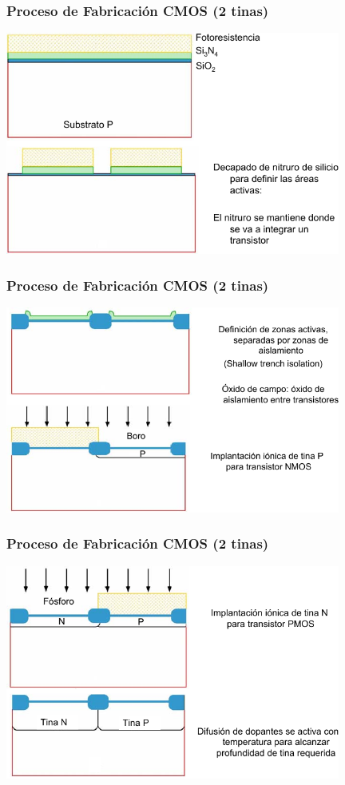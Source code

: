 \documentclass[aspectratio=169,10pt]{beamer}
\begin{document}
\begin{frame}
\frametitle{Proceso de Fabricación CMOS (2 tinas)}
\centering
\includegraphics[width=11cm]{CMOS1}
\end{frame}


\begin{frame}
\frametitle{Proceso de Fabricación CMOS (2 tinas)}
\centering
\includegraphics[width=11cm]{CMOS2}
\end{frame}


\begin{frame}
\frametitle{Proceso de Fabricación CMOS (2 tinas)}
\centering
\includegraphics[width=11cm]{CMOS3}
\end{frame}
\end{document}
